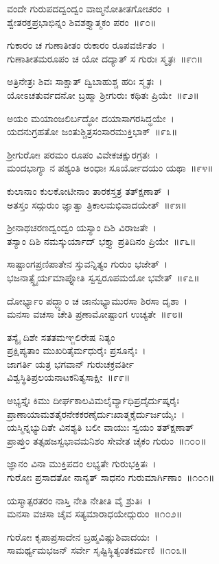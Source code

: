 ವಂದೇ ಗುರುಪದದ್ವಂದ್ವಂ ವಾಙ್ಮನೋತೀತಗೋಚರಂ~।\\
ಶ್ವೇತರಕ್ತಪ್ರಭಾಭಿನ್ನಂ ಶಿವಶಕ್ತ್ಯಾತ್ಮಕಂ ಪರಂ~॥೯೦॥

ಗುಕಾರಂ ಚ ಗುಣಾತೀತಂ ರುಕಾರಂ ರೂಪವರ್ಜಿತಂ~।\\
ಗುಣಾತೀತಮರೂಪಂ ಚ ಯೋ ದದ್ಯಾತ್ ಸ ಗುರುಃ ಸ್ಮೃತಃ~॥೯೧॥

ಅತ್ರಿನೇತ್ರಃ ಶಿವಃ ಸಾಕ್ಷಾತ್ ದ್ವಿಬಾಹುಶ್ಚ ಹರಿಃ ಸ್ಮೃತಃ~।\\
ಯೋಽಚತುರ್ವದನೋ ಬ್ರಹ್ಮಾ ಶ್ರೀಗುರುಃ ಕಥಿತಃ ಪ್ರಿಯೇ~॥೯೨॥

ಅಯಂ ಮಯಾಂಜಲಿರ್ಬದ್ಧೋ ದಯಾಸಾಗರಸಿದ್ಧಯೇ~।\\
ಯದನುಗ್ರಹತೋ ಜಂತುಶ್ಚಿತ್ರಸಂಸಾರಮುಕ್ತಿಭಾಕ್~॥೯೩॥

ಶ್ರೀಗುರೋಃ ಪರಮಂ ರೂಪಂ ವಿವೇಕಚಕ್ಷುರಗ್ರತಃ~।\\
ಮಂದಭಾಗ್ಯಾ ನ ಪಶ್ಯಂತಿ ಅಂಧಾಃ ಸೂರ್ಯೋದಯಂ ಯಥಾ~॥೯೪॥

ಕುಲಾನಾಂ ಕುಲಕೋಟೀನಾಂ ತಾರಕಸ್ತತ್ರ ತತ್‌ಕ್ಷಣಾತ್~।\\
ಅತಸ್ತಂ ಸದ್ಗುರುಂ ಜ್ಞಾತ್ವಾ ತ್ರಿಕಾಲಮಭಿವಾದಯೇತ್~॥೯೫॥

ಶ್ರೀನಾಥಚರಣದ್ವಂದ್ವಂ ಯಸ್ಯಾಂ ದಿಶಿ ವಿರಾಜತೇ~।\\
ತಸ್ಯಾಂ ದಿಶಿ ನಮಸ್ಕುರ್ಯಾದ್ ಭಕ್ತ್ಯಾ ಪ್ರತಿದಿನಂ ಪ್ರಿಯೇ~॥೯೬॥

ಸಾಷ್ಟಾಂಗಪ್ರಣಿಪಾತೇನ ಸ್ತುವನ್ನಿತ್ಯಂ ಗುರುಂ ಭಜೇತ್~।\\
ಭಜನಾತ್ಸ್ಥೈರ್ಯಮಾಪ್ನೋತಿ ಸ್ವಸ್ವರೂಪಮಯೋ ಭವೇತ್~॥೯೭॥

ದೋರ್ಭ್ಯಾಂ ಪದ್ಭ್ಯಾಂ ಚ ಜಾನುಭ್ಯಾಮುರಸಾ ಶಿರಸಾ ದೃಶಾ~।\\
ಮನಸಾ ವಚಸಾ ಚೇತಿ ಪ್ರಣಾಮೋಷ್ಟಾಂಗ ಉಚ್ಯತೇ~॥೯೮॥

ತಸ್ಯೈ ದಿಶೇ ಸತತಮಞ್ಜಲಿರೇಷ ನಿತ್ಯಂ\\
ಪ್ರಕ್ಷಿಪ್ಯತಾಂ ಮುಖರಿತೈರ್ಮಧುರೈಃ ಪ್ರಸೂನೈಃ~।\\
ಜಾಗರ್ತಿ ಯತ್ರ ಭಗವಾನ್ ಗುರುಚಕ್ರವರ್ತೀ\\
ವಿಶ್ವಸ್ಥಿತಿಪ್ರಲಯನಾಟಕನಿತ್ಯಸಾಕ್ಷೀ~॥೯೯॥

ಅಭ್ಯಸ್ತೈಃ ಕಿಮು ದೀರ್ಘಕಾಲವಿಮಲೈರ್ವ್ಯಾಧಿಪ್ರದೈರ್ದುಷ್ಕರೈಃ\\
ಪ್ರಾಣಾಯಾಮಶತೈರನೇಕಕರಣೈರ್ದುಃಖಾತ್ಮಕೈರ್ದುರ್ಜಯೈಃ~।\\
ಯಸ್ಮಿನ್ನಭ್ಯುದಿತೇ ವಿನಶ್ಯತಿ ಬಲೀ ವಾಯುಃ ಸ್ವಯಂ ತತ್‌ಕ್ಷಣಾತ್\\
ಪ್ರಾಪ್ತುಂ ತತ್ಸಹಜಸ್ವಭಾವಮನಿಶಂ ಸೇವೇತ ಚೈಕಂ ಗುರುಂ~॥೧೦೦॥

ಜ್ಞಾನಂ ವಿನಾ ಮುಕ್ತಿಪದಂ ಲಭ್ಯತೇ ಗುರುಭಕ್ತಿತಃ~।\\
ಗುರೋಃ ಪ್ರಸಾದತೋ ನಾನ್ಯತ್ ಸಾಧನಂ ಗುರುಮಾರ್ಗಿಣಾಂ~॥೧೦೧॥

ಯಸ್ಮಾತ್ಪರತರಂ ನಾಸ್ತಿ ನೇತಿ ನೇತೀತಿ ವೈ ಶ್ರುತಿಃ~।\\
ಮನಸಾ ವಚಸಾ ಚೈವ ಸತ್ಯಮಾರಾಧಯೇದ್ಗುರುಂ~॥೧೦೨॥

ಗುರೋಃ ಕೃಪಾಪ್ರಸಾದೇನ ಬ್ರಹ್ಮವಿಷ್ಣುಶಿವಾದಯಃ~।\\
ಸಾಮರ್ಥ್ಯಮಭಜನ್ ಸರ್ವೇ ಸೃಷ್ಟಿಸ್ಥಿತ್ಯಂತಕರ್ಮಣಿ~॥೧೦೩॥

